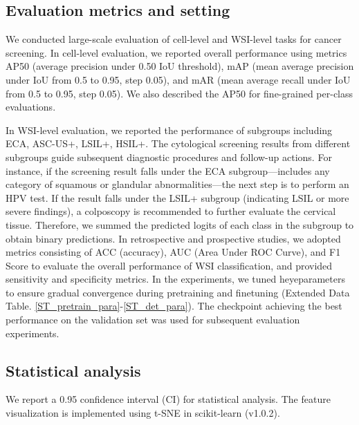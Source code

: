 \subsection*{Evaluation metrics and setting}\label{subsec4-8}
We conducted large-scale evaluation of cell-level and WSI-level tasks for cancer screening. In cell-level evaluation, we reported overall performance using metrics AP50 (average precision under 0.50 IoU threshold), mAP (mean average precision under IoU from 0.5 to 0.95, step 0.05), and mAR (mean average recall under IoU from 0.5 to 0.95, step 0.05). We also described the AP50 for fine-grained per-class evaluations. 



In WSI-level evaluation, we reported the performance of subgroups including ECA, ASC-US+, LSIL+, HSIL+. The cytological screening results from different subgroups guide subsequent diagnostic procedures and follow-up actions. For instance, if the screening result falls under the ECA subgroup—includes any category of squamous or glandular abnormalities—the next step is to perform an HPV test. If the result falls under the LSIL+ subgroup (indicating LSIL or more severe findings), a colposcopy is recommended to further evaluate the cervical tissue. Therefore, we summed the predicted logits of each class in the subgroup to obtain binary predictions. In retrospective and prospective studies, we adopted metrics consisting of ACC (accuracy), AUC (Area Under ROC Curve), and F1 Score to evaluate the overall performance of WSI classification, and provided sensitivity and specificity metrics. In the experiments, we tuned heyeparameters to ensure gradual convergence during pretraining and finetuning (Extended Data Table. \ref{ST_pretrain_para}-\ref{ST_det_para}). The checkpoint achieving the best performance on the validation set was used for subsequent evaluation experiments.

\subsection*{Statistical analysis}\label{subsec4-11}
We report a 0.95 confidence interval (CI) for statistical analysis. The feature visualization is implemented using t-SNE in scikit-learn (v1.0.2). 